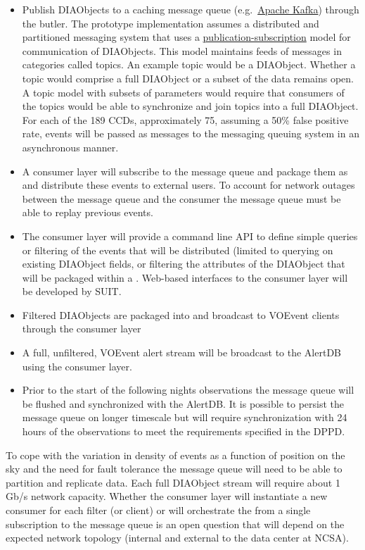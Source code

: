\begin{itemize}
\item Publish DIAObjects to a caching message queue (e.g.\ \hyperref[http://kafka.apache.org]{Apache Kafka}) through the butler. The prototype implementation assumes a distributed and partitioned messaging system that uses a \hyperref[https://en.wikipedia.org/wiki/Publish_subscribe_pattern]{publication-subscription} model for communication of DIAObjects. This model maintains feeds of messages in categories called topics. An example topic would be a DIAObject. Whether a topic would comprise a full DIAObject or a subset of the data remains open. A topic model with subsets of parameters would require that consumers of the topics would be able to synchronize and join topics into a full DIAObject. For each of the 189 CCDs, approximately 75, assuming a 50\% false positive rate, events will be passed as messages to the messaging queuing system in an asynchronous manner.
\item A consumer layer will subscribe to the  message queue and package them as \VOEvents and distribute these events to external users. To account for network outages between the message queue and the consumer the message queue must be able to replay previous events. 
\item  The consumer layer will provide a command line API to define simple queries or filtering of the events that will be distributed (limited to querying on existing DIAObject fields, or filtering the attributes of the DIAObject that will be packaged within a \VOEvent. Web-based interfaces to the consumer layer will be developed by SUIT. 
\item Filtered DIAObjects are packaged into \VOEvents and broadcast to VOEvent clients through the consumer layer
\item A full, unfiltered, VOEvent alert stream will be broadcast to the AlertDB using the consumer layer. 
\item Prior to the start of the following nights observations the message queue will be flushed and synchronized with the AlertDB. It is possible to persist the message queue on longer timescale but will require synchronization with 24 hours of the observations to meet the requirements specified in the DPPD.
\end{itemize}


To cope with the variation in density of events as a function of position on the sky and the need for fault tolerance the message queue will need to be able to partition and replicate data. Each full DIAObject stream will require about 1 Gb/s network capacity. Whether the consumer layer will instantiate a new consumer for each filter (or client) or will orchestrate the \VOEvents from a single subscription to the message queue is an open question that will depend on the expected network topology (internal and external to the data center at NCSA).

